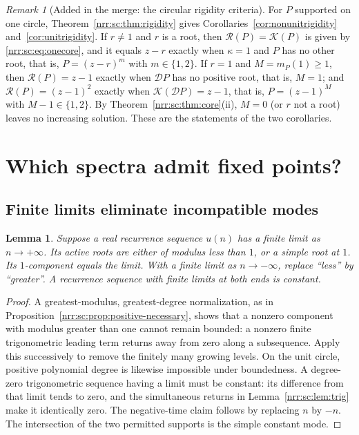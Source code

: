 \documentclass[11pt,letterpaper]{article}
\newtheorem{lemma}[theorem]{Lemma}
\theoremstyle{definition}
\theoremstyle{remark}
\newtheorem{remark}[theorem]{Remark}
\newcommand{\scD}{\mathcal D}
\newcommand{\core}{\mathcal R}
\newcommand{\pcore}{\mathcal K}
\begin{document}
\begin{remark}[Added in the merge: the circular rigidity criteria]
\label{nrr:sc:rem:rigidity-recovers}
For $P$ supported on one circle, Theorem~\ref{nrr:sc:thm:rigidity} gives
Corollaries~\ref{cor:nonunitrigidity} and~\ref{cor:unitrigidity}. If
$r\ne1$ and $r$ is a root, then $\core(P)=\pcore(P)$ is given by
\eqref{nrr:sc:eq:onecore}, and it equals $z-r$ exactly when $\kappa=1$ and
$P$ has no other root, that is, $P=(z-r)^m$ with $m\in\{1,2\}$. If $r=1$
and $M=m_P(1)\ge1$, then $\core(P)=z-1$ exactly when $\scD P$ has no
positive root, that is, $M=1$; and $\core(P)=(z-1)^2$ exactly when
$\pcore(\scD P)=z-1$, that is, $P=(z-1)^M$ with $M-1\in\{1,2\}$. By
Theorem~\ref{nrr:sc:thm:core}(ii), $M=0$ (or $r$ not a root) leaves no
increasing solution. These are the statements of the two corollaries.
\end{remark}

\section{Which spectra admit fixed points?}
\label{nrr:sc:sec:fixed}

\subsection{Finite limits eliminate incompatible modes}

\begin{lemma}
\label{nrr:sc:lem:limits}
Suppose a real recurrence sequence $u(n)$ has a finite limit as
$n\to+\infty$. Its active roots are either of modulus less than $1$,
or a simple root at $1$. Its $1$-component equals the limit.
With a finite limit as $n\to-\infty$, replace ``less'' by ``greater''.
A recurrence sequence with finite limits at both ends is constant.
\end{lemma}
\begin{proof}
A greatest-modulus, greatest-degree normalization, as in
Proposition~\ref{nrr:sc:prop:positive-necessary}, shows that a nonzero
component with modulus greater than one cannot remain bounded: a nonzero
finite trigonometric leading term returns away from zero along a subsequence.
Apply this successively to remove the finitely many growing levels.
On the unit circle, positive polynomial degree is likewise impossible
under boundedness. A degree-zero trigonometric sequence having a limit
must be constant: its difference from that limit tends to zero, and the
simultaneous returns in Lemma~\ref{nrr:sc:lem:trig} make it identically zero.
The negative-time claim follows by replacing $n$ by $-n$.
The intersection of the two permitted supports is the simple constant mode.
\end{proof}
\end{document}

